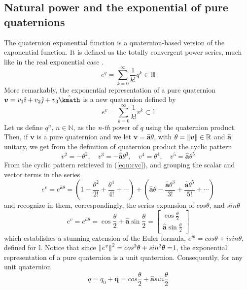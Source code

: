 \subsection{Natural power and the exponential of pure quaternions}
The quaternion exponential function is a quaternion-based version of the exponential function. It is defined as the totally convergent power series, much like in the real exponential case \cite{sola2017quaternion}.
\begin{equation}
e^{q}=\sum_{k=0}^{\infty} \frac{1}{k !} q^{k} \in \mathbb{I I}
\end{equation}
More remarkably, the exponential representation of a pure quaternion $\boldsymbol{v} = v_1 \hat{\imath}+v_2 \hat{\jmath}+v_3 \hat{\kmath}$ is a new quaternion defined by
\begin{equation}
    e^{v}=\sum_{k=0}^{\infty} \frac{1}{k !} v^{k} \subset \mathbb{I}
\end{equation}
Let us define $q^n, \,n \in \mathbb{N}$, as the \textit{n-th} power of $q$ using the quaternion product. Then, if $\boldsymbol{v}$ is a pure quaternion and we let $\boldsymbol{v}=\hat{\boldsymbol{{a}}} \theta$, with $\theta = \norm{\boldsymbol{v}} \in \mathbb{R}$ and $\hat{\boldsymbol{a}}$  unitary, we get from the definition of quaternion product the cyclic pattern
\begin{equation}\label{eqn:cyc}
v^{2}=-\theta^{2}, \quad v^{3}=-\widehat{\boldsymbol{a}} \theta^{3}, \quad v^{4}=\theta^{4}, \quad v^{5}=\widehat{\boldsymbol{a}} \theta^{5}
\end{equation}
From the cyclic pattern retrieved in (\ref{eqn:cyc}), and grouping the scalar and vector terms in the series
\begin{equation}
    e^{v}=e^{\hat{\boldsymbol{a}} \theta}=\left(1-\frac{\theta^{2}}{2 !}+\frac{\theta^{4}}{4 !}+\cdots\right)+\left(\hat{\boldsymbol{a}} \theta-\frac{\hat{\boldsymbol{a}} \theta^{3}}{3 !}+\frac{\hat{\boldsymbol{a}} \theta^{5}}{5 !}+\cdots\right)
\end{equation}
and recognize in them, correspondingly, the series expansion of $cos\theta, \,\text{and } sin\theta$
\begin{equation}
e^{v}=e^{\hat{a} \theta}=\cos \frac{\theta}{2}+\hat{\boldsymbol{a}} \sin \frac{\theta}{2}=\left[\begin{array}{c}
\cos \frac{\theta}{2} \\
\hat{\boldsymbol{a}} \sin \frac{\theta}{2}
\end{array}\right]
\end{equation}
which establishes a stunning extension of the Euler formula, $e^{i\theta}= cos\theta + i sin\theta$, defined for $\mathbb{I}$. Notice that since $\norm{e^v}^2  =cos^2 \theta+  sin^2 \theta= $1, the exponential representation of a pure quaternion is a unit quaternion.
Consequently, for any unit quaternion
\begin{equation} \label{eqn:sin_cos}
    q=q_0+\boldsymbol{q}=cos\frac{\theta}{2}+\hat{\boldsymbol{a}} sin\frac{\theta}{2}
\end{equation}



